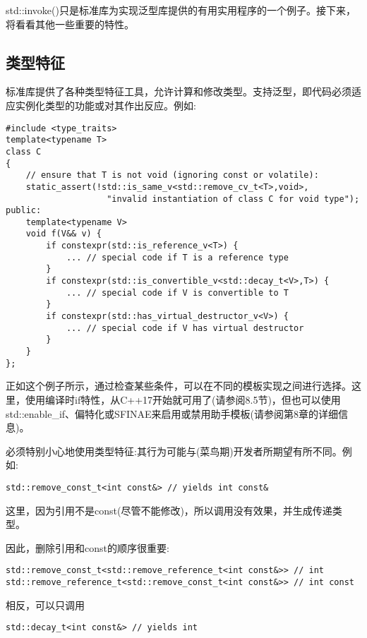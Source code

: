 
std::invoke()只是标准库为实现泛型库提供的有用实用程序的一个例子。接下来，将看看其他一些重要的特性。

\subsection{类型特征}

标准库提供了各种类型特征工具，允许计算和修改类型。支持泛型，即代码必须适应实例化类型的功能或对其作出反应。例如:

\begin{lstlisting}[style=styleCXX]
#include <type_traits>
template<typename T>
class C
{
	// ensure that T is not void (ignoring const or volatile):
	static_assert(!std::is_same_v<std::remove_cv_t<T>,void>,
					"invalid instantiation of class C for void type");
public:
	template<typename V>
	void f(V&& v) {
		if constexpr(std::is_reference_v<T>) {
			... // special code if T is a reference type
		}
		if constexpr(std::is_convertible_v<std::decay_t<V>,T>) {
			... // special code if V is convertible to T
		}
		if constexpr(std::has_virtual_destructor_v<V>) {
			... // special code if V has virtual destructor
		}
	}
};
\end{lstlisting}

正如这个例子所示，通过检查某些条件，可以在不同的模板实现之间进行选择。这里，使用编译时if特性，从C++17开始就可用了(请参阅8.5节)，但也可以使用std::enable\_if、偏特化或SFINAE来启用或禁用助手模板(请参阅第8章的详细信息)。

必须特别小心地使用类型特征:其行为可能与(菜鸟期)开发者所期望有所不同。例如:

\begin{lstlisting}[style=styleCXX]
std::remove_const_t<int const&> // yields int const&
\end{lstlisting}

这里，因为引用不是const(尽管不能修改)，所以调用没有效果，并生成传递类型。

因此，删除引用和const的顺序很重要:

\begin{lstlisting}[style=styleCXX]
std::remove_const_t<std::remove_reference_t<int const&>> // int
std::remove_reference_t<std::remove_const_t<int const&>> // int const
\end{lstlisting}

相反，可以只调用

\begin{lstlisting}[style=styleCXX]
std::decay_t<int const&> // yields int
\end{lstlisting}

